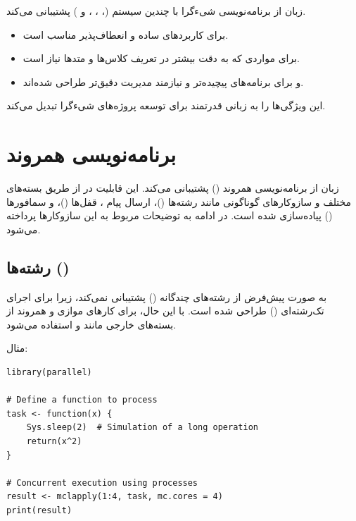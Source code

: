 \documentclass[11pt, a4paper, oneside]{book}
\begin{document}
		 	زبان  از برنامه‌نویسی شیءگرا با چندین سیستم (، ، ، و ) پشتیبانی می‌کند.
		 	
		 	\begin{itemize}
		 		
		 		\item {} برای کاربردهای ساده و انعطاف‌پذیر مناسب است.
		 		
		 		\item {} برای مواردی که به دقت بیشتر در تعریف کلاس‌ها و متدها نیاز است.
		 		
		 		\item {} و  برای برنامه‌های پیچیده‌تر و نیازمند مدیریت دقیق‌تر طراحی شده‌اند.
		 		
		 	\end{itemize}
		 	
		 	این ویژگی‌ها  را به زبانی قدرتمند برای توسعه پروژه‌های شیءگرا تبدیل می‌کند.
		 	
	
	\chapter{برنامه‌نویسی همروند}
	
		زبان  از برنامه‌نویسی همروند () پشتیبانی می‌کند. این قابلیت در  از طریق بسته‌های مختلف و سازوکارهای گوناگونی مانند رشته‌ها ()، ارسال پیام ، قفل‌ها ()، و سمافورها () پیاده‌سازی شده است. در ادامه به توضیحات مربوط به این سازوکارها پرداخته می‌شود.
		
		\section{رشته‌ها ()}
		
			به صورت پیش‌فرض از رشته‌های چندگانه () پشتیبانی نمی‌کند، زیرا  برای اجرای تک‌رشته‌ای () طراحی شده است. با این حال، برای کارهای موازی و همروند از بسته‌های خارجی مانند  و  استفاده می‌شود.
		
		مثال: 
		\begin{latin}
			\begin{lstlisting}[caption={\lr{Multicore Processing}}] 
library(parallel)

# Define a function to process
task <- function(x) {
	Sys.sleep(2)  # Simulation of a long operation
	return(x^2)
}

# Concurrent execution using processes
result <- mclapply(1:4, task, mc.cores = 4)
print(result)

			\end{lstlisting}
		\end{latin}
		
\end{document}
